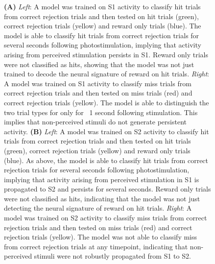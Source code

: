 \begin{figure}[!h]
{\textbf{(A)} \textit{Left}: A model was trained on S1 activity to classify hit trials from correct rejection trials and then tested on hit trials (green), correct rejection trials (yellow) and reward only trials (blue). The model is able to classify hit trials from correct rejection trials for several seconds following photostimulation, implying that activity arising from perceived stimulation persists in S1. Reward only trials were not classified as hits, showing that the model was not just trained to decode the neural signature of reward on hit trials. \textit{Right}: A model was trained on S1 activity to classify miss trials from correct rejection trials and then tested on miss trials (red) and correct rejection trials (yellow). The model is able to distinguish the two trial types for only for ~1 second following stimulation. This implies that non-perceived stimuli do not generate persistent activity. \textbf{(B)} \textit{Left}: A model was trained on S2 activity to classify hit trials from correct rejection trials and then tested on hit trials (green), correct rejection trials (yellow) and reward only trials (blue). As above, the model is able to classify hit trials from correct rejection trials for several seconds following photostimulation, implying that activity arising from perceived stimulation in S1 is propagated to S2 and persists for several seconds. Reward only trials were not classified as hits, indicating that the model was not just detecting the neural signature of reward on hit trials. \textit{Right}: A model was trained on S2 activity to classify miss trials from correct rejection trials and then tested on miss trials (red) and correct rejection trials (yellow). The model was not able to classify miss from correct rejection trials at any timepoint, indicating that non-perceived stimuli were not robustly propagated from S1 to S2.
} 
\label{fig:fig3}
\end{figure}

